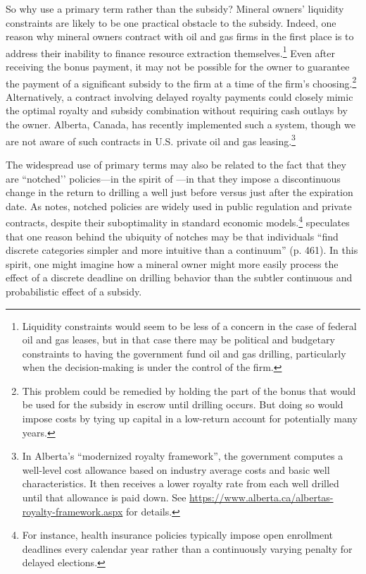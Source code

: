 \documentclass[12pt]{article}
\begin{document}
So why use a primary term rather than the subsidy? Mineral owners' liquidity constraints are likely to be one practical obstacle to the subsidy. Indeed, one reason why mineral owners contract with oil and gas firms in the first place is to address their inability to finance resource extraction themselves.\footnote{Liquidity constraints would seem to be less of a concern in the case of federal oil and gas leases, but in that case there may be political and budgetary constraints to having the government fund oil and gas drilling, particularly when the decision-making is under the control of the firm.} Even after receiving the bonus payment, it may not be possible for the owner to guarantee the payment of a significant subsidy to the firm at a time of the firm's choosing.\footnote{This problem could be remedied by holding the part of the bonus that would be used for the subsidy in escrow until drilling occurs. But doing so would impose costs by tying up capital in a low-return account for potentially many years.} Alternatively, a contract involving delayed royalty payments could closely mimic the optimal royalty and subsidy combination without requiring cash outlays by the owner. Alberta, Canada, has recently implemented such a system, though we are not aware of such contracts in U.S. private oil and gas leasing.\footnote{In Alberta's ``modernized royalty framework'', the government computes a well-level cost allowance based on industry average costs and basic well characteristics. It then receives a lower royalty rate from each well drilled until that allowance is paid down. See \url{https://www.alberta.ca/albertas-royalty-framework.aspx} for details.} 

The widespread use of primary terms may also be related to the fact that they are ``notched’’ policies---in the spirit of \citet{bib:kleven}---in that they impose a discontinuous change in the return to drilling a well just before versus just after the expiration date. As \citet{bib:kleven} notes, notched policies are widely used in public regulation and private contracts, despite their suboptimality in standard economic models.\footnote{For instance, health insurance policies typically impose open enrollment deadlines every calendar year rather than a continuously varying penalty for delayed elections.} \citet{bib:kleven} speculates that one reason behind the ubiquity of notches may be that individuals ``find discrete categories simpler and more intuitive than a continuum'' (p. 461). In this spirit, one might imagine how a mineral owner might more easily process the effect of a discrete deadline on drilling behavior than the subtler continuous and probabilistic effect of a subsidy.
\end{document}
